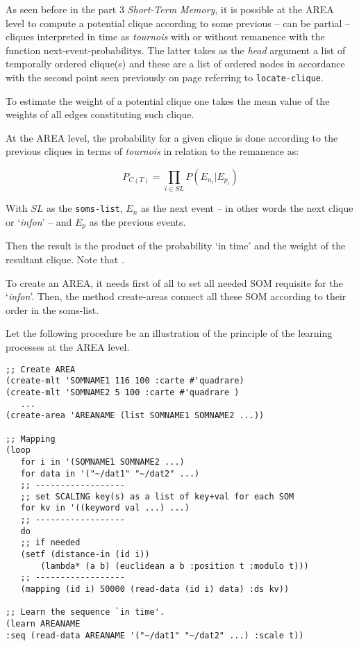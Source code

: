 \bigskip

As seen before in the part 3 \textsl{Short-Term Memory}, it is possible at the AREA level to compute a potential clique according to some previous -- can be partial -- cliques interpreted in time as \textit{tournois} with or without remanence with the function \glspl{next-event-probability}. The latter takes as the \textit{head} argument a list of temporally ordered clique(s) and these are a list of ordered nodes in accordance with the second point seen previously on page \pageref{txt:on} referring to \texttt{locate-clique}.

\smallskip

To estimate the weight of a potential clique one takes the mean value of the weights of all edges constituting such clique. 

\smallskip
At the AREA level, the probability for a given clique is done according to the previous cliques in terms of \textit{tournois} in relation to the remanence as:

$$P_{C(T)} = \displaystyle \prod_{i \in SL} P(E_{n_i}|E_{p_i})$$

With $SL$ as the \texttt{soms-list}, $E_{n}$ as the next event -- in other words the next clique or `\textit{infon}' -- and  $E_{p}$ as the previous events.

\smallskip

Then the result is the product of the probability `in time' and the weight of the resultant clique. Note that .

\bigskip
\bigskip

\label{arinst}

\bigskip

To create an AREA, it needs first of all to set all needed SOM requisite for the `\textit{infon}'. Then, the method \glspl{create-area} connect all these SOM according to their order in the soms-list.

\bigskip

Let the following procedure be an illustration of the principle of the learning processes at the AREA level.

\begin{lstlisting}[language=N3]
;; Create AREA
(create-mlt 'SOMNAME1 116 100 :carte #'quadrare)
(create-mlt 'SOMNAME2 5 100 :carte #'quadrare )
   ...
(create-area 'AREANAME (list SOMNAME1 SOMNAME2 ...))

;; Mapping 
(loop
   for i in '(SOMNAME1 SOMNAME2 ...)
   for data in '("~/dat1" "~/dat2" ...)
   ;; ------------------
   ;; set SCALING key(s) as a list of key+val for each SOM
   for kv in '((keyword val ...) ...) 
   ;; ------------------
   do
   ;; if needed
   (setf (distance-in (id i))
	   (lambda* (a b) (euclidean a b :position t :modulo t)))
   ;; ------------------
   (mapping (id i) 50000 (read-data (id i) data) :ds kv))
       
;; Learn the sequence `in time'.
(learn AREANAME 
:seq (read-data AREANAME '("~/dat1" "~/dat2" ...) :scale t))
\end{lstlisting}


